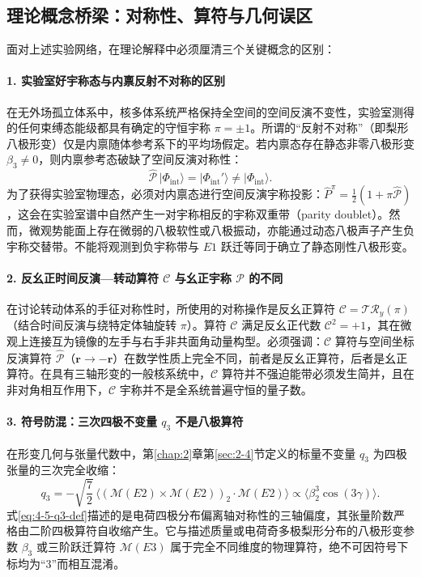 \subsection{理论概念桥梁：对称性、算符与几何误区}\label{sec:4-5-3}

面对上述实验网络，在理论解释中必须厘清三个关键概念的区别：

\paragraph{1. 实验室好宇称态与内禀反射不对称的区别}
在无外场孤立体系中，核多体系统严格保持全空间的空间反演不变性，实验室测得的任何束缚态能级都具有确定的守恒宇称 $\pi = \pm 1$。所谓的“反射不对称”（即梨形八极形变）仅是内禀随体参考系下的平均场假定。若内禀态存在静态非零八极形变 $\beta_3 \neq 0$，则内禀参考态破缺了空间反演对称性：
\begin{equation}\label{eq:4-5-intrinsic-parity-breaking}
\hat{\mathcal{P}}\,|\Phi_{\mathrm{int}}\rangle = |\Phi_{\mathrm{int}}'\rangle \neq |\Phi_{\mathrm{int}}\rangle .
\end{equation}
为了获得实验室物理态，必须对内禀态进行空间反演宇称投影：$\hat{P}^\pi = \frac{1}{2}(1 + \pi \hat{\mathcal{P}})$，这会在实验室谱中自然产生一对宇称相反的宇称双重带（parity doublet）。然而，微观势能面上存在微弱的八极软性或八极振动，亦能通过动态八极声子产生负宇称交替带。不能将观测到负宇称带与 $E1$ 跃迁等同于确立了静态刚性八极形变。

\paragraph{2. 反幺正时间反演---转动算符 $\mathcal{C}$ 与幺正宇称 $\mathcal{P}$ 的不同}
在讨论转动体系的手征对称性时，所使用的对称操作是反幺正算符 $\mathcal{C} = \mathcal{T} \mathcal{R}_y(\pi)$（结合时间反演与绕特定体轴旋转 $\pi$）。算符 $\mathcal{C}$ 满足反幺正代数 $\mathcal{C}^2 = +1$，其在微观上连接互为镜像的左手与右手非共面角动量构型。必须强调：$\mathcal{C}$ 算符与空间坐标反演算符 $\hat{\mathcal{P}}$（$\mathbf{r} \to -\mathbf{r}$）在数学性质上完全不同，前者是反幺正算符，后者是幺正算符。在具有三轴形变的一般核系统中，$\mathcal{C}$ 算符并不强迫能带必须发生简并，且在非对角相互作用下，$\mathcal{C}$ 宇称并不是全系统普遍守恒的量子数。

\paragraph{3. 符号防混：三次四极不变量 $q_3$ 不是八极算符}
在形变几何与张量代数中，第\ref{chap:2}章第\ref{sec:2-4}节定义的标量不变量 $q_3$ 为四极张量的三次完全收缩：
\begin{equation}\label{eq:4-5-q3-def}
q_3 = -\sqrt{\frac{7}{2}}\,\langle (\mathcal{M}(E2) \times \mathcal{M}(E2))_2 \cdot \mathcal{M}(E2) \rangle \propto \langle \beta_2^3 \cos(3\gamma) \rangle .
\end{equation}
式\eqref{eq:4-5-q3-def}描述的是电荷四极分布偏离轴对称性的三轴偏度，其张量阶数严格由二阶四极算符自收缩产生。它与描述质量或电荷奇多极梨形分布的八极形变参数 $\beta_3$ 或三阶跃迁算符 $\mathcal{M}(E3)$ 属于完全不同维度的物理算符，绝不可因符号下标均为“3”而相互混淆。

